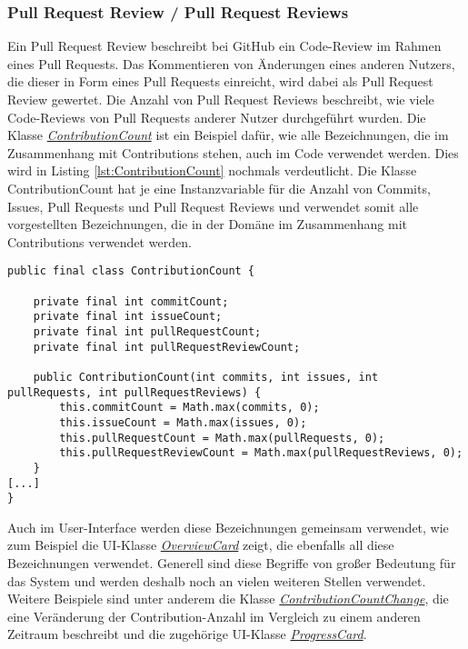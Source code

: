 \subsubsection*{Pull Request Review / Pull Request Reviews}
\label{sec:PullRequestReviews}
Ein Pull Request Review beschreibt bei GitHub ein Code-Review im Rahmen eines Pull Requests.
Das Kommentieren von Änderungen eines anderen Nutzers, die dieser in Form eines Pull Requests einreicht, wird dabei als Pull Request Review gewertet.
Die Anzahl von Pull Request Reviews beschreibt, wie viele Code-Reviews von Pull Requests anderer Nutzer durchgeführt wurden.
\newline
\newline
Die Klasse \href{https://github.com/lukaspanni/OpenSourceStats/blob/main/app/src/main/java/de/lukaspanni/opensourcestats/data/ContributionCount.java}{\textit{ContributionCount}} ist ein Beispiel dafür, wie alle Bezeichnungen, die im Zusammenhang mit Contributions stehen, auch im Code verwendet werden. Dies wird in Listing \ref{lst:ContributionCount} nochmals verdeutlicht. Die Klasse ContributionCount hat je eine Instanzvariable für die Anzahl von Commits, Issues, Pull Requests und Pull Request Reviews und verwendet somit alle vorgestellten Bezeichnungen, die in der Domäne im Zusammenhang mit Contributions verwendet werden.
\begin{lstlisting}[caption={Auszug aus der Klasse ContributionCount}, captionpos=b, label={lst:ContributionCount}]
public final class ContributionCount {

    private final int commitCount;
    private final int issueCount;
    private final int pullRequestCount;
    private final int pullRequestReviewCount;

    public ContributionCount(int commits, int issues, int pullRequests, int pullRequestReviews) {
        this.commitCount = Math.max(commits, 0);
        this.issueCount = Math.max(issues, 0);
        this.pullRequestCount = Math.max(pullRequests, 0);
        this.pullRequestReviewCount = Math.max(pullRequestReviews, 0);
    }
[...]
}
\end{lstlisting}
Auch im User-Interface werden diese Bezeichnungen gemeinsam verwendet, wie zum Beispiel die UI-Klasse \href{https://github.com/lukaspanni/OpenSourceStats/blob/main/app/src/main/java/de/lukaspanni/opensourcestats/ui/custom_elements/card/OverviewCard.java}{\textit{OverviewCard}} zeigt, die ebenfalls all diese Bezeichnungen verwendet.
\newline
Generell sind diese Begriffe von großer Bedeutung für das System und werden deshalb noch an vielen weiteren Stellen verwendet.
Weitere Beispiele sind unter anderem die Klasse \href{https://github.com/lukaspanni/OpenSourceStats/blob/main/app/src/main/java/de/lukaspanni/opensourcestats/data/ContributionCountChange.java}{\textit{ContributionCountChange}}, die eine Veränderung der Contribution-Anzahl im Vergleich zu einem anderen Zeitraum beschreibt und die zugehörige UI-Klasse \href{https://github.com/lukaspanni/OpenSourceStats/blob/main/app/src/main/java/de/lukaspanni/opensourcestats/ui/custom_elements/card/ProgressCard.java}{\textit{ProgressCard}}.




